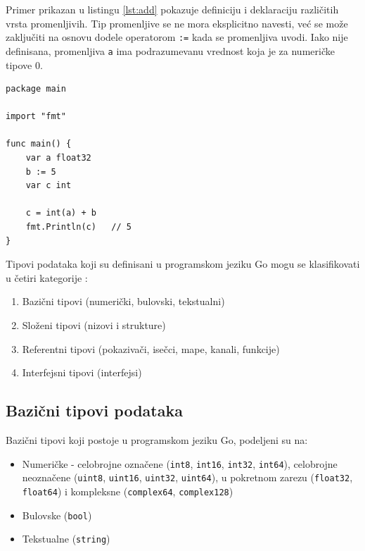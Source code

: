 \documentclass[12pt,oneside]{memoir}
\begin{document}
Primer prikazan u listingu \ref{lst:add} pokazuje definiciju i deklaraciju različitih vrsta promenljivih. Tip promenljive se ne mora eksplicitno navesti, već se može zaključiti na osnovu dodele operatorom \texttt{:=} kada se promenljiva uvodi. Iako nije definisana, promenljiva \texttt{a} ima podrazumevanu vrednost koja je za numeričke tipove 0.

\begin{center}
\begin{lstlisting}[caption=Primer programa koji ilustruje rad sa promenljivama, label={lst:add},  backgroundcolor=\color{background}]
package main

import "fmt"

func main() {
	var a float32
	b := 5
	var c int

	c = int(a) + b
	fmt.Println(c)	 // 5
}
\end{lstlisting}
\end{center}

\newpage

Tipovi podataka koji su definisani u programskom jeziku Go mogu se klasifikovati u četiri kategorije \cite{bookGoProg}: 
\begin{enumerate}
\item Bazični tipovi  (numerički, bulovski, tekstualni)
\item Složeni tipovi (nizovi i strukture)
\item Referentni tipovi (pokazivači, isečci, mape, kanali, funkcije)
\item Interfejsni tipovi (interfejsi)
\end{enumerate}


\subsection{Bazični tipovi podataka}

Bazični tipovi koji postoje u programskom jeziku Go, podeljeni su na:
\begin{itemize}

\item Numeričke -  celobrojne označene (\texttt{int8}, \texttt{int16}, \texttt{int32}, \texttt{int64}),
 celobrojne neoznačene  (\texttt{uint8}, \texttt{uint16}, \texttt{uint32}, \texttt{uint64}), u pokretnom zarezu (\texttt{float32}, \texttt{float64}) i kompleksne (\texttt{complex64}, \texttt{complex128})

\item Bulovske  (\texttt{bool})

\item Tekstualne (\texttt{string})

\end{itemize}
\end{document}
